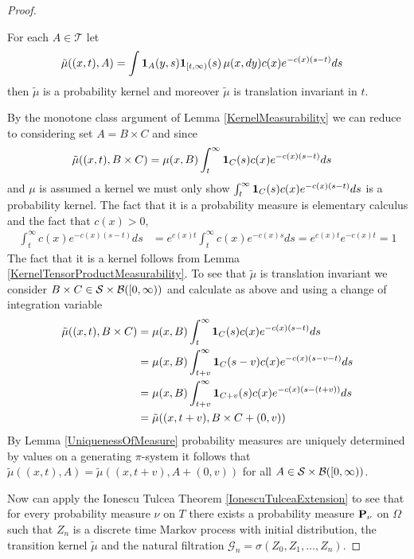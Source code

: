 \begin{proof}
\begin{clm} For each $A \in \mathcal{T}$ let 
\begin{align*}
\tilde{\mu}((x,t), A) &=
\int \textbf{1}_{A}(y,s) \textbf{1}_{[t,\infty)}(s) \, \mu(x, dy) c(x) e^{-c(x)(s-t)} ds
\end{align*}
then $\tilde{\mu}$ is a probability kernel and moreover $\tilde{\mu}$ is translation invariant in $t$.
\end{clm}
By the monotone class argument of Lemma \ref{KernelMeasurability} we can reduce to considering
set $A = B \times C$ and since 
\begin{align*}
\tilde{\mu}((x,t), B \times C) &= \mu(x, B) \int_t^\infty \textbf{1}_{C}(s) c(x) e^{-c(x)(s-t)} ds
\end{align*}
and $\mu$ is assumed a kernel we must only show $\int_t^\infty \textbf{1}_{C}(s) c(x) e^{-c(x)(s-t)} ds$
is a probability kernel.  The fact that it is a probability measure is elementary calculus and the fact that $c(x) > 0$,
\begin{align*}
\int_t^\infty c(x) e^{-c(x)(s-t)} ds &= e^{c(x)t} \int_t^\infty c(x) e^{-c(x)s} ds = e^{c(x)t} e^{-c(x)t} =1
\end{align*}
The fact that it is a kernel follows from Lemma \ref{KernelTensorProductMeasurability}.  To see that $\tilde{\mu}$ is translation invariant we consider
$B \times C \in \mathcal{S} \times \mathcal{B}([0,\infty))$ and calculate as above and using a change of integration variable 
\begin{align*}
\tilde{\mu}((x,t), B \times C) &= \mu(x, B) \int_t^\infty \textbf{1}_{C}(s) c(x) e^{-c(x)(s-t)} ds \\
&= \mu(x, B) \int_{t+v}^\infty \textbf{1}_{C}(s-v) c(x) e^{-c(x)(s - v -t)} ds \\
&= \mu(x, B) \int_{t+v}^\infty \textbf{1}_{C+v}(s) c(x) e^{-c(x)(s - (t+v))} ds \\
&= \tilde{\mu}((x,t+v), B \times C+(0,v))
\end{align*}
By Lemma \ref{UniquenessOfMeasure} probability measures are uniquely determined by values on a generating $\pi$-system it follows that 
$\tilde{\mu}((x,t), A) = \tilde{\mu}((x,t+v), A+(0,v))$ for all $A \in \mathcal{S} \times \mathcal{B}([0,\infty))$.

Now can apply the Ionescu Tulcea Theorem \ref{IonescuTulceaExtension} to see that for every probability measure $\nu$ on $T$ there
exists a probability measure $\textbf{P}_\nu$ on $\Omega$ such that $Z_n$ is a discrete time Markov process
with initial distribution, the transition kernel $\tilde{\mu}$ and the natural filtration $\mathcal{G}_n = \sigma(Z_0, Z_1, \dotsc, Z_n)$.


\end{proof}
